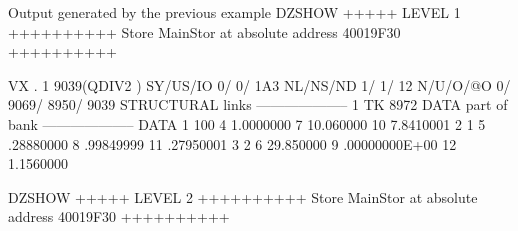 \begin{landscapebody}
\begin{XMPt}{Output generated by the previous example}
DZSHOW  +++++ LEVEL     1 ++++++++++            Store  MainStor at absolute address 40019F30      ++++++++++                     
                                                                                                                                 
 VX  .     1     9039(QDIV2   ) SY/US/IO    0/    0/ 1A3 NL/NS/ND    1/    1/      12 N/U/O/@O       0/    9069/    8950/    9039
STRUCTURAL links                                          --------------------                                                   
          1    TK        8972                                                                                                    
DATA part of bank                                         --------------------                                                   
DATA      1               100     4     1.0000000         7     10.060000        10     7.8410001                                
          2                 1     5     .28880000         8     .99849999        11     .27950001                                
          3                 2     6     29.850000         9     .00000000E+00    12     1.1560000                                
                                                                                                                                 
DZSHOW  +++++ LEVEL     2 ++++++++++            Store  MainStor at absolute address 40019F30      ++++++++++                     
                                                                                                                                 

\end{XMPt}
\end{landscapebody}
